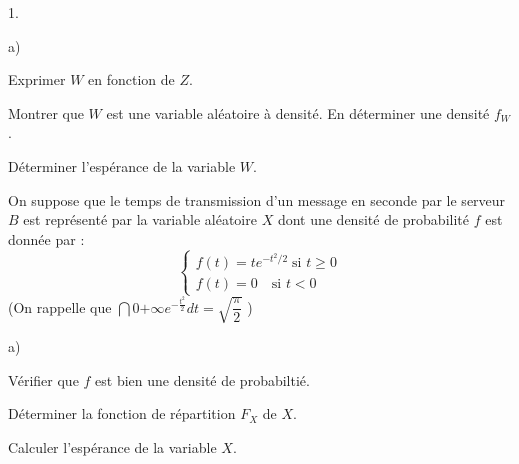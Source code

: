 \documentclass[11pt]{article}%
\begin{document}
\begin{noliste}{1.}
\begin{noliste}{a)}
\item Exprimer $W$ en fonction de $Z$.

\item Montrer que $W$ est une variable aléatoire à densité. En
déterminer
une densité $f_{W}$.

\item Déterminer l'espérance de la variable $W.$
\end{noliste}

\item On suppose que le temps de transmission d'un message en seconde
par le
serveur $B$ est représenté par la variable aléatoire $X$ dont une
densité de
probabilité $f$ est donnée par : 
\[
\left\{ 
\begin{array}{c}
f\left( t\right) = te^{-t^{2}/2}\;\text{si }t\geq 0 \\
f\left( t\right) = 0\quad \text{si }t<0
\end{array}
\right. 
\]
(On rappelle que $\dint{0}{+ \infty }e^{-\frac{t^{2}}{2}}dt =
\sqrt{\dfrac{\pi }{2}}$ )

\begin{noliste}{a)}
 \setlength{\itemsep}{2mm}
\item Vérifier que $f$ est bien une densité de probabiltié.

\item Déterminer la fonction de répartition $F_{X}$ de $X.$

\item Calculer l'espérance de la variable $X.$
\end{noliste}
\end{noliste}

\label{fin}
\end{document}
